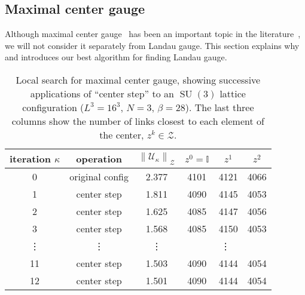 \documentclass[preprint,aps,prd]{revtex4-2}
\newcommand{\zentrum}{\mathcal{Z}}       %
\newcommand{\config}{\mathcal{U}}
\DeclareMathOperator{\SU}{SU}
\begin{document}
\subsection{Maximal center gauge}

Although maximal center gauge~\cite{del_debbio_center_1997}
has been an important topic in the
literature~\cite{greensite_confinement_2003},
we will not consider it separately from Landau gauge.
This section explains why and introduces our best algorithm
for finding Landau gauge.

\begin{table}
  \caption{Local search for maximal center gauge,
    showing successive applications of ``center step'' to
    an $\SU(3)$ lattice configuration ($L^3=16^3$, $N=3$, $\beta=28$).
    The last three columns show the number of links closest
    to each element of the center, $z^k \in \zentrum$.
    \label{center1}}
  \begin{tabular}{c|c|c|ccc}
    iteration $\kappa$ & operation & $\left\lVert \config_\kappa \right\rVert_\zentrum$
     & $z^0=\mathbb{I}$ & $z^1$ & $z^2$ \\
    \hline
    0 & original config & 2.377 & 4101 & 4121 & 4066\\
    1 & center step     & 1.811 & 4090 & 4145 & 4053\\
    2 & center step     & 1.625 & 4085 & 4147 & 4056\\
    3 & center step     & 1.568 & 4085 & 4150 & 4053\\
    \vdots & \vdots & \vdots & \multicolumn{3}{c}{\vdots}\\
    11 & center step    & 1.503 & 4090 & 4144 & 4054\\
    12 & center step    & 1.501 & 4090 & 4144 & 4054\\
  \end{tabular}
\end{table}
\end{document}
